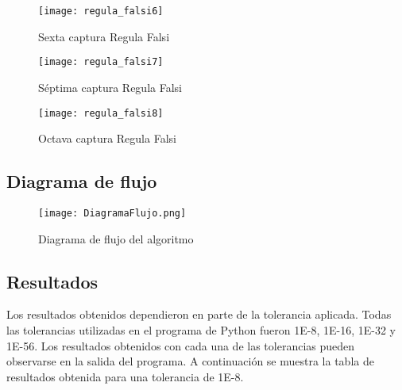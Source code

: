 \documentclass{article}
\begin{document}
\begin{figure}[H]
    \centering
    \texttt{[image: regula\_falsi6]}
    \caption{Sexta captura Regula Falsi}
    \label{fig:regula_falsi6}
\end{figure}

\begin{figure}[H]
    \centering
    \texttt{[image: regula\_falsi7]}
    \caption{Séptima captura Regula Falsi}
    \label{fig:regula_falsi7}
\end{figure}

\begin{figure}[H]
    \centering
    \texttt{[image: regula\_falsi8]}
    \caption{Octava captura Regula Falsi}
    \label{fig:regula_falsi8}
\end{figure}


\subsection{Diagrama de flujo}
\begin{figure}[H]
    \centering
    \texttt{[image: DiagramaFlujo.png]}
    \caption{Diagrama de flujo del algoritmo}
    \label{fig:DiagramaFlujo}
\end{figure}

\subsection{Resultados}
Los resultados obtenidos dependieron en parte de la tolerancia aplicada. Todas las tolerancias utilizadas en el programa de Python fueron 1E-8, 1E-16, 1E-32 y 1E-56. Los resultados obtenidos con cada una de las tolerancias pueden observarse en la salida del programa. 
A continuación se muestra la tabla de resultados obtenida para una tolerancia de 1E-8.
\end{document}
